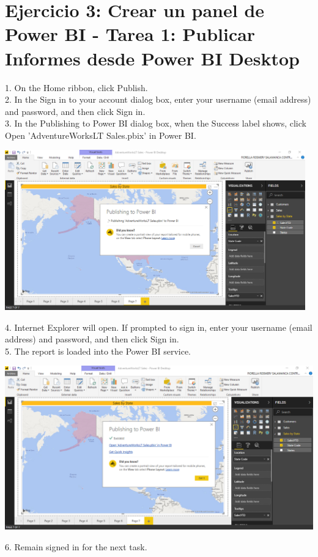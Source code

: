 \section{Ejercicio 3: Crear un panel de Power BI - Tarea 1: Publicar Informes desde Power BI Desktop} 

1. On the Home ribbon, click Publish.\\
2. In the Sign in to your account dialog box, enter your username (email address) and password, and
then click Sign in.\\
3. In the Publishing to Power BI dialog box, when the Success label shows, click Open
'AdventureWorksLT Sales.pbix' in Power BI.\\

	\begin{center}
	\includegraphics[width=13cm]{./Imagenes/Ejercicio3/Tarea1/1}
	\end{center}	

4. Internet Explorer will open. If prompted to sign in, enter your username (email address) and
password, and then click Sign in.\\
5. The report is loaded into the Power BI service.\\

	\begin{center}
	\includegraphics[width=15cm]{./Imagenes/Ejercicio3/Tarea1/2}
	\end{center}	

6. Remain signed in for the next task.\\